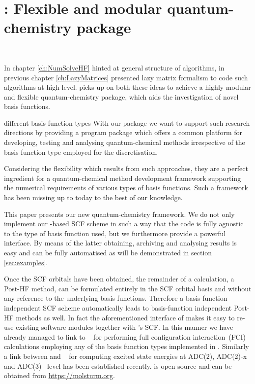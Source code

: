 \chapter{\molsturm: Flexible and modular quantum-chemistry package}
\label{ch:Molsturm}
 \\

\noindent

In chapter \vref{ch:NumSolveHF}
hinted at general structure of \SCF algorithms,
in previous chapter \ref{ch:LazyMatrices}
presented lazy matrix formalism to code such algorithms at high level.
\molsturm picks up on both these ideas to achieve
a highly modular and flexible quantum-chemistry package,
which aids the investigation of novel basis functions.

different basis function types
With our \molsturm package we want to support such research directions
by providing a program package
which offers a common platform for developing, testing and analysing
quantum-chemical methods irrespective of the basis function type employed for
the discretisation.

Considering the flexibility which results from such approaches,
they are a perfect ingredient for
a quantum-chemical method development framework
supporting the numerical requirements of various types of basis functions.
Such a framework has been missing up to today to the best of our knowledge.

This paper presents our new \molsturm quantum-chemistry framework.
We do not only implement our \contraction-based SCF scheme
in such a way that the code is fully agnostic to the type of basis function used,
but we furthermore provide a powerful \python interface.
By means of the latter obtaining, archiving and analysing results
is easy and can be fully automatised
as will be demonstrated in section \ref{sec:examples}.

Once the SCF orbitals have been obtained,
the remainder of a calculation, \eg a Post-HF method,
can be formulated entirely in the SCF orbital basis
and without any reference to the underlying basis functions.
Therefore a basis-function independent SCF scheme automatically
leads to basis-function independent Post-HF methods as well.
In fact the aforementioned \python interface of \molsturm
makes it easy to re-use existing software modules
together with \molsturm's SCF.
In this manner we have already managed to link \molsturm to \pyscf~\cite{Sun2017}
for performing full configuration interaction~(FCI) calculations employing any of the
basis function types implemented in \molsturm.
Similarly a link between \molsturm and \adcman~\cite{Wormit2014}
for computing excited state energies at ADC(2),
ADC(2)-x and ADC(3)~\cite{Schirmer1982,Trofimov1999} level
has been established recently.
\molsturm is open-source and can be obtained from \url{https://molsturm.org}.


